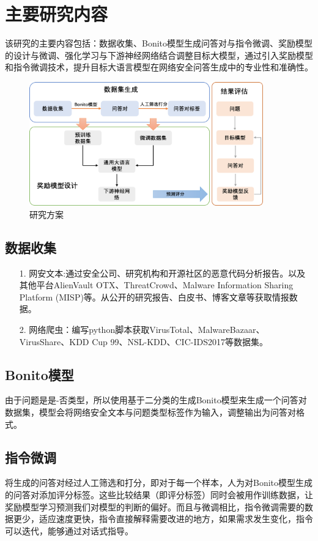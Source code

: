 \section{主要研究内容}
该研究的主要内容包括：数据收集、Bonito模型生成问答对与指令微调、奖励模型的设计与微调、强化学习与下游神经网络结合调整目标大模型，通过引入奖励模型和指令微调技术，提升目标大语言模型在网络安全问答生成中的专业性和准确性。
\begin{figure}[htbp]
    \centering
    \includegraphics[width=0.9\textwidth]{./img/liucheng.png}
    \caption{研究方案}\label{fig:研究方案}
\end{figure}
\subsection{数据收集}
\begin{itemize}
    \item[1.] 网安文本:通过安全公司、研究机构和开源社区的恶意代码分析报告。以及其他平台AlienVault OTX、ThreatCrowd、Malware Information Sharing Platform (MISP)等。从公开的研究报告、白皮书、博客文章等获取情报数据。
    \item[2.] 网络爬虫：编写python脚本获取VirusTotal、MalwareBazaar、VirusShare、KDD Cup 99、NSL-KDD、CIC-IDS2017等数据集。
\end{itemize}
\subsection{Bonito模型}
由于问题是是-否类型，所以使用基于二分类的生成Bonito模型来生成一个问答对数据集，模型会将网络安全文本与问题类型标签作为输入，调整输出为问答对格式。
\subsection{指令微调}
将生成的问答对经过人工筛选和打分，即对于每一个样本，人为对Bonito模型生成的问答对添加评分标签。这些比较结果（即评分标签）同时会被用作训练数据，让奖励模型学习预测我们对模型的判断的偏好。而且与微调相比，指令微调需要的数据更少，适应速度更快\cite{pmlr-v202-longpre23a}，指令直接解释需要改进的地方，如果需求发生变化，指令可以迭代，能够通过对话式指导。


